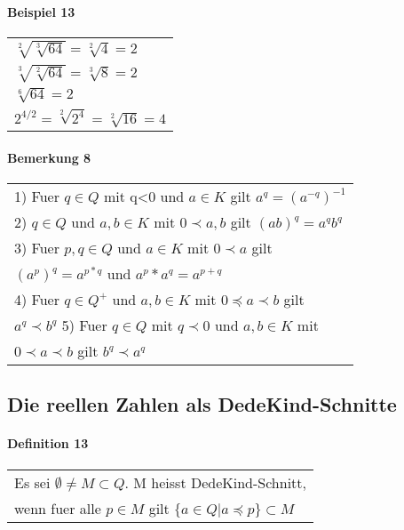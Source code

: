 \documentclass[a4paper]{scrartcl}
\begin{document}
\paragraph{Beispiel 13}
\begin{tabbing}
\begin{tabular}{l}
$\sqrt[2]{\sqrt[3]{64}} = \sqrt[2]{4} = 2$\\
$\sqrt[3]{\sqrt[2]{64}}=\sqrt[3]{8}=2$\\
$\sqrt[6]{64}=2$\\
$2^{4/2} = \sqrt[2]{2^4}=\sqrt[2]{16}=4$
\end{tabular}
\end{tabbing}

\paragraph{Bemerkung 8}
\begin{tabbing}
\begin{tabular}{l}
1) Fuer $q\in Q$ mit q<0 und $a\in K$ gilt $a^q=(a^{-q})^{-1}$\\
2) $q\in Q$ und $a,b\in K$ mit $0\prec a,b$ gilt $(ab)^q=a^qb^q$\\
3) Fuer $p,q \in Q$ und $a\in K$ mit $0\prec a$ gilt\\
$(a^p)^q = a^{p*q}$ und $a^p*a^q = a^{p+q}$\\
4) Fuer $q\in Q^+$ und $a,b\in K$ mit $0 \preceq a \prec b$ gilt\\
$a^q\prec b^q$
5) Fuer $q\in Q$ mit $q\prec 0$ und $a,b\in K$ mit\\
$0 \prec a \prec b$ gilt $b^q \prec a^q$\
\end{tabular}
\end{tabbing}

\subsection{Die reellen Zahlen als DedeKind-Schnitte}

\paragraph{Definition 13}
\begin{tabbing}
\begin{tabular}{l}
Es sei $\emptyset\neq M \subset Q$. M heisst DedeKind-Schnitt,\\
wenn fuer alle $p\in M$ gilt $\{ a\in Q|a\preceq p \}\subset M$
\end{tabular}
\end{tabbing}
\end{document}
